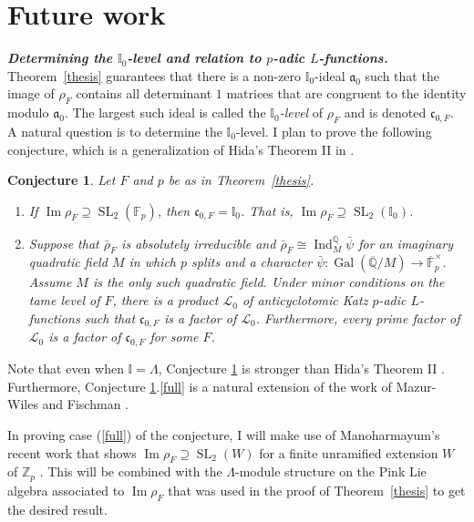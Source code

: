 \documentclass[12pt]{article}
\newcommand{\Aa}{\mathfrak{a}}
\newcommand{\cc}{\mathfrak{c}}
\newcommand{\F}{\mathbb{F}}
\newcommand{\I}{\mathbb{I}}
\newcommand{\aL}{\mathcal{L}}
\newcommand{\Q}{\mathbb{Q}}
\newcommand{\Z}{\mathbb{Z}}
\newtheorem{conj}{Conjecture}
\theoremstyle{definition}
\DeclareMathOperator{\Gal}{Gal}
\DeclareMathOperator{\im}{Im}
\DeclareMathOperator{\Ind}{Ind}
\DeclareMathOperator{\SL}{SL}
\begin{document}
\section*{Future work}
\textit{\textbf{Determining the $\I_0$-level and relation to $p$-adic $L$-functions.}}  Theorem~\ref{thesis} guarantees that there is a non-zero $\I_0$-ideal $\Aa_0$ such that the image of $\rho_F$ contains all determinant $1$ matrices that are congruent to the identity modulo $\Aa_0$.  The largest such ideal is called the \textit{$\I_0$-level} of $\rho_F$ and is denoted $\cc_{0,F}$.  A natural question is to determine the $\I_0$-level.  I plan to prove the following conjecture, which is a generalization of Hida's Theorem II in \cite{Hida15}.  

\begin{conj}\label{level}
Let $F$ and $p$ be as in Theorem~\ref{thesis}.  
\begin{enumerate}
\item\label{full} If $\im \rho_F \supseteq \SL_2(\F_p)$, then $\cc_{0,F} = \I_0$.  That is, $\im \rho_F \supseteq \SL_2(\I_0)$.
\item\label{Katz} Suppose that $\bar{\rho}_F$ is absolutely irreducible and $\bar{\rho}_F \cong \Ind_M^\Q \bar{\psi}$ for an imaginary quadratic field $M$ in which $p$ splits and a character $\bar{\psi} : \Gal(\overline{\Q}/M) \to \overline{\F}_p^\times$.  Assume $M$ is the only such quadratic field.  Under minor conditions on the tame level of $F$, there is a product $\aL_0$ of anticyclotomic Katz $p$-adic $L$-functions such that $\cc_{0, F}$ is a factor of $\aL_0$.  Furthermore, every prime factor of $\aL_0$ is a factor of $\cc_{0, F}$ for some $F$.  
\end{enumerate}
\end{conj}

Note that even when $\I = \Lambda$, Conjecture \ref{level} is stronger than Hida's Theorem II \cite{Hida15}.  Furthermore, Conjecture \ref{level}.\ref{full} is a natural extension of the work of  Mazur-Wiles \cite{MazurWiles86} and Fischman \cite{Fischman02}.

In proving case (\ref{full}) of the conjecture, I will make use of Manoharmayum's recent work that shows $\im \rho_F \supseteq \SL_2(W)$ for a finite unramified extension $W$ of $\Z_p$ \cite{Manoharmayum15}.  This will be combined with the $\Lambda$-module structure on the Pink Lie algebra associated to $\im \rho_F$ that was used in the proof of Theorem~\ref{thesis} to get the desired result.
\end{document}
